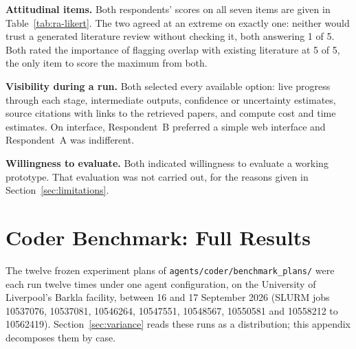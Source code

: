 \textbf{Attitudinal items.} Both respondents' scores on all seven items are
given in Table~\ref{tab:ra-likert}. The two agreed at an extreme on exactly one:
neither would trust a generated literature review without checking it, both
answering 1 of 5. Both rated the importance of flagging overlap with existing
literature at 5 of 5, the only item to score the maximum from both.

\textbf{Visibility during a run.} Both selected every available option: live
progress through each stage, intermediate outputs, confidence or uncertainty
estimates, source citations with links to the retrieved papers, and compute cost
and time estimates. On interface, Respondent~B preferred a simple web interface
and Respondent~A was indifferent.

\textbf{Willingness to evaluate.} Both indicated willingness to evaluate a
working prototype. That evaluation was not carried out, for the reasons given in
Section~\ref{sec:limitations}.

\chapter{Coder Benchmark: Full Results}
\label{app:benchmark}

The twelve frozen experiment plans of \texttt{agents/coder/benchmark\_plans/}
were each run twelve times under one agent configuration, on the University of
Liverpool's Barkla facility, between 16 and 17 September 2026 (SLURM jobs
10537076, 10537081, 10546264, 10547551, 10548567, 10550581 and 10558212 to
10562419). Section~\ref{sec:variance} reads these runs as a distribution;
this appendix decomposes them by case.

